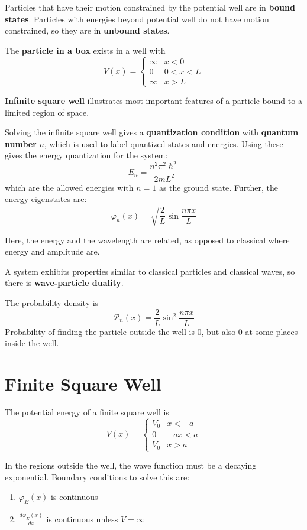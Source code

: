 \documentclass[11pt]{article}
\begin{document}
Particles that have their motion constrained by the potential well are in \textbf{bound states}.
Particles with energies beyond potential well do not have motion constrained, so they are in
\textbf{unbound states}.

The \textbf{particle in a box} exists in a well with
$$
V(x) = \begin{cases}
        \infty & x < 0 \\
        0 & 0 < x < L \\
        \infty & x > L
\end{cases}
$$

\textbf{Infinite square well} illustrates most important features of a particle bound to a limited region of space.

Solving the infinite square well gives a \textbf{quantization condition} with \textbf{quantum number} \(n\), which is
used to label quantized states and energies.
Using these gives the energy quantization for the system:
$$
E_{n} = \frac{n^{2}\pi^{2}\hslash^{2}}{2mL^{2}}
$$
which are the allowed energies with \(n=1\) as the ground state.
Further, the energy eigenstates are:
$$
\varphi_{n}(x) = \sqrt{\frac{2}{L}} \sin \frac{n\pi x}{L}
$$

Here, the energy and the wavelength are related, as opposed to classical where energy and amplitude are.

A system exhibits properties similar to classical particles and classical waves, so there is
\textbf{wave-particle duality}.

The probability density is
$$
\mathcal{P}_{n}(x) = \frac{2}{L} \sin^{2} \frac{n\pi x}{L}
$$
Probability of finding the particle outside the well is 0, but also 0 at some places inside the well.
\section{Finite Square Well}
\label{sec:org620bd43}
The potential energy of a finite square well is
$$
V(x) = \begin{cases}
       V_{0} & x < -a \\
       0 & -a x < a \\
       V_{0} & x > a
\end{cases}
$$

In the regions outside the well, the wave function must be a decaying exponential.
Boundary conditions to solve this are:
\begin{enumerate}
\item \(\varphi_{E}(x)\) is continuous
\item \(\frac{d\varphi_{E}(x)}{dx}\) is continuous unless \(V = \infty\)
\end{enumerate}
\end{document}
